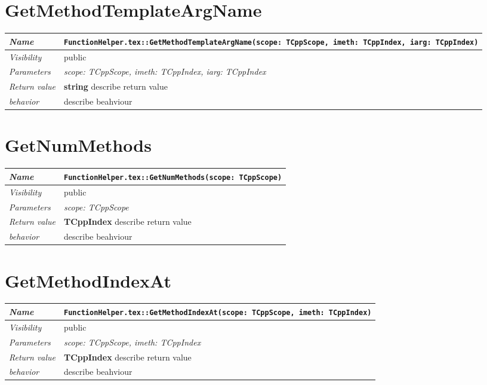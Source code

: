  \section{GetMethodTemplateArgName}
\begin{longtable}{p{3cm} @{\hskip 1cm} p{12cm}}
 \hline
\textit{Name} & \texttt{FunctionHelper.tex::GetMethodTemplateArgName(scope: TCppScope, imeth: TCppIndex, iarg: TCppIndex)}\\
\hline
 \textit{Visibility} & public\\
\hline
\textit{Parameters} & \textit{scope: TCppScope, imeth: TCppIndex, iarg: TCppIndex}\\
\hline
\textit{Return value} & \textbf{ string} describe return value\\
  \hline
 \textit{behavior} & describe beahviour \\
\hline
\end{longtable} \pagebreak
 \section{GetNumMethods}
\begin{longtable}{p{3cm} @{\hskip 1cm} p{12cm}}
 \hline
\textit{Name} & \texttt{FunctionHelper.tex::GetNumMethods(scope: TCppScope)}\\
\hline
 \textit{Visibility} & public\\
\hline
\textit{Parameters} & \textit{scope: TCppScope}\\
\hline
\textit{Return value} & \textbf{ TCppIndex} describe return value\\
  \hline
 \textit{behavior} & describe beahviour \\
\hline
\end{longtable} \pagebreak
 \section{GetMethodIndexAt}
\begin{longtable}{p{3cm} @{\hskip 1cm} p{12cm}}
 \hline
\textit{Name} & \texttt{FunctionHelper.tex::GetMethodIndexAt(scope: TCppScope, imeth: TCppIndex)}\\
\hline
 \textit{Visibility} & public\\
\hline
\textit{Parameters} & \textit{scope: TCppScope, imeth: TCppIndex}\\
\hline
\textit{Return value} & \textbf{ TCppIndex} describe return value\\
  \hline
 \textit{behavior} & describe beahviour \\
\hline
\end{longtable} \pagebreak
